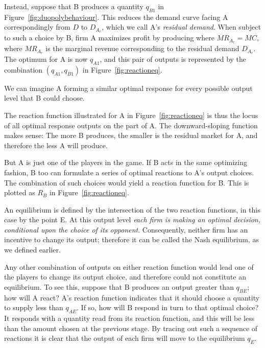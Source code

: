 

Instead, suppose that B produces a quantity $q_{B1}$ in Figure~\ref{fig:duopolybehaviour}. This reduces the demand curve facing A correspondingly from $D$ to $D_{A_r}$, which we call A's \textit{residual demand}. When subject to such a choice by B, firm A maximizes profit by producing where $MR_{A_r}=MC$, where $MR_{A_r}$ is the marginal revenue corresponding to the residual demand $D_{A_r}$. The optimum for A is now $q_{A1}$, and this pair of outputs is represented by the combination $(q_{A1},q_{B1})$ in Figure~\ref{fig:reactioneq}.



We can imagine A forming a similar optimal response for every possible output level that B could choose. 

The reaction function illustrated for A in Figure~\ref{fig:reactioneq} is thus the locus of all optimal response outputs on the part of A. The downward-sloping function makes sense: The more B produces, the smaller is the residual market for A, and therefore the less A will produce.

But A is just one of the players in the game. If B acts in the same optimizing fashion, B too can formulate a series of optimal reactions to A's output choices. The combination of such choices would yield a reaction function for B. This is plotted as $R_{B}$ in Figure~\ref{fig:reactioneq}.

An equilibrium is defined by the intersection of the two reaction functions, in this case by the point E. At this output level \textit{each firm is making an optimal decision, conditional upon the choice of its opponent}. Consequently, neither firm has an incentive to change its output; therefore it can be called the Nash equilibrium, as we defined earlier.

Any other combination of outputs on either reaction function would lead one of the players to change its output choice, and therefore could not constitute an equilibrium. To see this, suppose that B produces an output greater than $q_{BE}$; how will A react? A's reaction function indicates that it should choose a quantity to supply less than $q_{AE}$. If so, how will B respond in turn to that optimal choice? It responds with a quantity read from its reaction function, and this will be less than the amount chosen at the previous stage. By tracing out such a sequence of reactions it is clear that the output of each firm will move to the equilibrium $q_E$.

